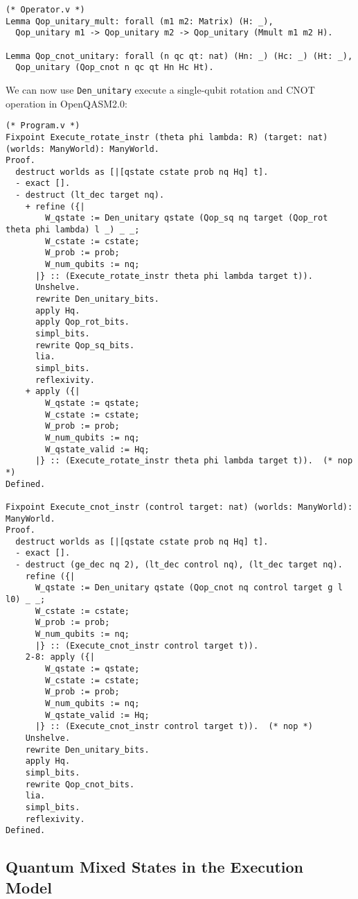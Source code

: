 \documentclass[10pt,a4paper]{article}
\newcommand{\<}{\langle}
\renewcommand{\>}{\rangle}
\begin{document}
\begin{enumerate}
\begin{lstlisting}
(* Operator.v *)
Lemma Qop_unitary_mult: forall (m1 m2: Matrix) (H: _),
  Qop_unitary m1 -> Qop_unitary m2 -> Qop_unitary (Mmult m1 m2 H).

Lemma Qop_cnot_unitary: forall (n qc qt: nat) (Hn: _) (Hc: _) (Ht: _),
  Qop_unitary (Qop_cnot n qc qt Hn Hc Ht).
\end{lstlisting}
\end{enumerate}

We can now use \texttt{Den\_unitary} execute a single-qubit rotation and CNOT
operation in OpenQASM2.0:

\begin{lstlisting}
(* Program.v *)
Fixpoint Execute_rotate_instr (theta phi lambda: R) (target: nat) (worlds: ManyWorld): ManyWorld.
Proof.
  destruct worlds as [|[qstate cstate prob nq Hq] t].
  - exact [].
  - destruct (lt_dec target nq).
    + refine ({|
        W_qstate := Den_unitary qstate (Qop_sq nq target (Qop_rot theta phi lambda) l _) _ _;
        W_cstate := cstate;
        W_prob := prob;
        W_num_qubits := nq;
      |} :: (Execute_rotate_instr theta phi lambda target t)).
      Unshelve.
      rewrite Den_unitary_bits.
      apply Hq.
      apply Qop_rot_bits.
      simpl_bits.
      rewrite Qop_sq_bits.
      lia.
      simpl_bits.
      reflexivity.
    + apply ({|
        W_qstate := qstate;
        W_cstate := cstate;
        W_prob := prob;
        W_num_qubits := nq;
        W_qstate_valid := Hq;
      |} :: (Execute_rotate_instr theta phi lambda target t)).  (* nop *)
Defined.

Fixpoint Execute_cnot_instr (control target: nat) (worlds: ManyWorld): ManyWorld.
Proof.
  destruct worlds as [|[qstate cstate prob nq Hq] t].
  - exact [].
  - destruct (ge_dec nq 2), (lt_dec control nq), (lt_dec target nq).
    refine ({|
      W_qstate := Den_unitary qstate (Qop_cnot nq control target g l l0) _ _;
      W_cstate := cstate;
      W_prob := prob;
      W_num_qubits := nq;
      |} :: (Execute_cnot_instr control target t)).
    2-8: apply ({|
        W_qstate := qstate;
        W_cstate := cstate;
        W_prob := prob;
        W_num_qubits := nq;
        W_qstate_valid := Hq;
      |} :: (Execute_cnot_instr control target t)).  (* nop *)
    Unshelve.
    rewrite Den_unitary_bits.
    apply Hq.
    simpl_bits.
    rewrite Qop_cnot_bits.
    lia.
    simpl_bits.
    reflexivity.
Defined.
\end{lstlisting}


\subsection{Quantum Mixed States in the Execution Model}
\end{document}
